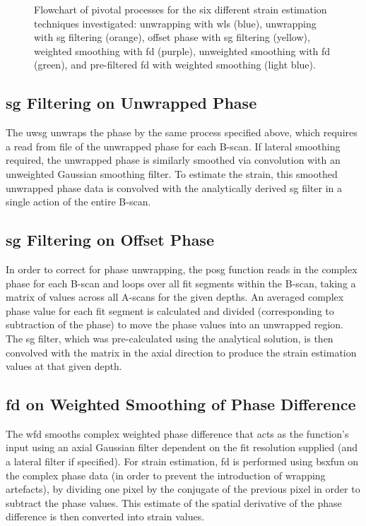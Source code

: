 {\begin{figure}[h!]
\begin{tikzpicture}[node distance=2cm, remember picture]
\end{tikzpicture}
\caption{Flowchart of pivotal processes for the six different strain estimation techniques investigated: unwrapping with \ac{wls} (blue), unwrapping with \ac{sg} filtering (orange), offset phase with \ac{sg} filtering (yellow), weighted smoothing with \ac{fd} (purple), unweighted smoothing with \ac{fd} (green), and pre-filtered \ac{fd} with weighted smoothing (light blue).}
\label{flowchart}
\end{figure}

\clearpage
}

\subsection{\ac{sg} Filtering on Unwrapped Phase}
The \ac{uwsg} unwraps the phase by the same process specified above, which requires a read from file of the unwrapped phase for each B-scan. If lateral smoothing required, the unwrapped phase is similarly smoothed via convolution with an unweighted Gaussian smoothing filter. To estimate the strain, this smoothed unwrapped phase data is convolved with the analytically derived \ac{sg} filter in a single action of the entire B-scan.
   
\subsection{\ac{sg} Filtering on Offset Phase}
In order to correct for phase unwrapping, the \ac{posg} function reads in the complex phase for each B-scan and loops over all fit segments within the B-scan, taking a matrix of values across all A-scans for the given depths. An averaged complex phase value for each fit segment is calculated and divided (corresponding to subtraction of the phase) to move the phase values into an unwrapped region. The \ac{sg} filter, which was pre-calculated using the analytical solution, is then convolved with the matrix in the axial direction to produce the strain estimation values at that given depth. 

\subsection{\ac{fd} on Weighted Smoothing of Phase Difference}
The \ac{wfd} smooths complex weighted phase difference that acts as the function's input using an axial Gaussian filter dependent on the fit resolution supplied (and a lateral filter if specified). For strain estimation, \ac{fd} is performed using bsxfun on the complex phase data (in order to prevent the introduction of  wrapping artefacts), by dividing one pixel by the conjugate of the previous pixel in order to subtract the phase values. This estimate of the spatial derivative of the phase difference is then converted into strain values.

